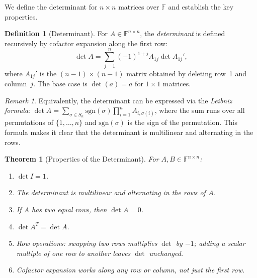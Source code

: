 \documentclass[11pt,a4paper]{article}
\theoremstyle{definition}
\newtheorem{definition}{Definition}[section]
\theoremstyle{plain}
\newtheorem{theorem}{Theorem}[section]
\theoremstyle{remark}
\newtheorem{remark}{Remark}[section]
\newcommand{\F}{\mathbb{F}}
\begin{document}
We define the determinant for $n \times n$ matrices over $\F$ and establish the key properties.

\begin{definition}[Determinant]
\label{def:determinant}
For $A \in \F^{n \times n}$, the \emph{determinant} is defined recursively by cofactor
expansion along the first row:
\[
    \det A = \sum_{j=1}^n (-1)^{1+j} A_{1j} \det A_{1j}',
\]
where $A_{1j}'$ is the $(n-1) \times (n-1)$ matrix obtained by deleting row~1 and column~$j$.
The base case is $\det(a) = a$ for $1 \times 1$ matrices.
\end{definition}

\begin{remark}
\label{rem:leibniz}
Equivalently, the determinant can be expressed via the \emph{Leibniz formula}:
$\det A = \sum_{\sigma \in S_n} \mathrm{sgn}(\sigma) \prod_{i=1}^n A_{i,\sigma(i)}$,
where the sum runs over all permutations of $\{1, \ldots, n\}$ and $\mathrm{sgn}(\sigma)$
is the sign of the permutation. This formula makes it clear that the determinant is
multilinear and alternating in the rows.
\end{remark}

\begin{theorem}[Properties of the Determinant]
\label{thm:det_properties}
For $A, B \in \F^{n \times n}$:
\begin{enumerate}[nosep]
    \item $\det I = 1$.
    \item The determinant is multilinear and alternating in the rows of $A$.
    \item If $A$ has two equal rows, then $\det A = 0$.
    \item $\det A^T = \det A$.
    \item Row operations: swapping two rows multiplies $\det$ by $-1$; adding a scalar multiple
          of one row to another leaves $\det$ unchanged.
    \item Cofactor expansion works along \emph{any} row or column, not just the first row.
\end{enumerate}
\end{theorem}
\end{document}
